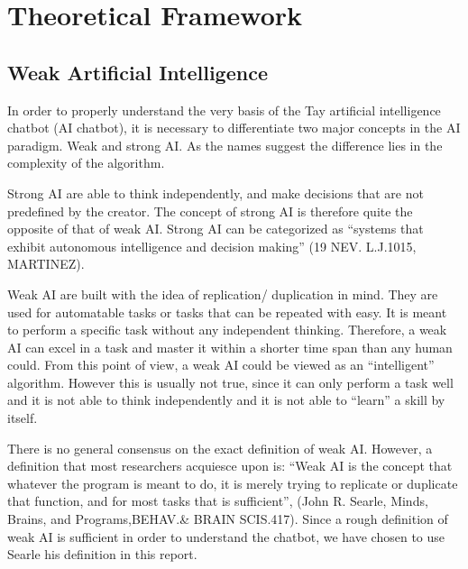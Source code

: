 \chapter{Theoretical Framework}

\section{Weak Artificial Intelligence}
In order to properly understand the very basis of the Tay artificial intelligence chatbot (AI chatbot), it is necessary to differentiate two major concepts in the AI paradigm. Weak and strong AI. As the names suggest the difference lies in the complexity of the algorithm.

Strong AI are able to think independently, and make decisions that are not predefined by the creator. The concept of strong AI is therefore quite the opposite of that of weak AI. Strong AI can be categorized as “systems that exhibit autonomous intelligence and decision making” (19 NEV. L.J.1015, MARTINEZ).

Weak AI are built with the idea of replication/ duplication in mind. They are used for automatable tasks or tasks that can be repeated with easy. It is meant to perform a specific task without any independent thinking. Therefore, a weak AI can excel in a task and master it within a shorter time span than any human could. From this point of view, a weak AI could be viewed as an “intelligent” algorithm. However this is usually not true, since it can only perform a task well and it is not able to think independently and it is not able to “learn” a skill by itself.

There is no general consensus on the exact definition of weak AI. However, a definition that most researchers acquiesce upon is: “Weak AI is the concept that whatever the program is meant to do, it is merely trying to replicate or duplicate that function, and for most tasks that is sufficient”, (John R. Searle, Minds, Brains, and Programs,BEHAV.\& BRAIN SCIS.417). Since a rough definition of weak AI is sufficient in order to understand the chatbot, we have chosen to use Searle his definition in this report.


